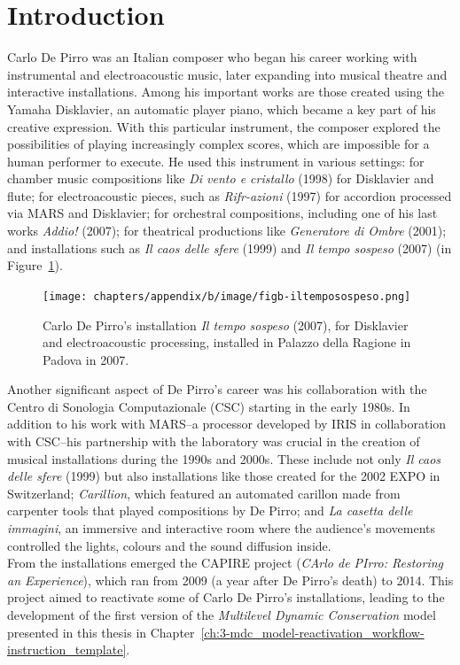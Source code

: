 \section{Introduction}
Carlo De Pirro was an Italian composer who began his career working with instrumental and electroacoustic music, later expanding into musical theatre and interactive installations. Among his important works are those created using the Yamaha Disklavier, an automatic player piano, which became a key part of his creative expression. With this particular instrument, the composer explored the possibilities of playing increasingly complex scores, which are impossible for a human performer to execute. He used this instrument in various settings: for chamber music compositions like \textit{Di vento e cristallo} (1998) for Disklavier and flute; for electroacoustic pieces, such as \textit{Rifr-azioni} (1997) for accordion processed via MARS and Disklavier; for orchestral compositions, including one of his last works \textit{Addio!} (2007); for theatrical productions like\textit{ Generatore di Ombre} (2001); and installations such as \textit{Il caos delle sfere} (1999) and \textit{Il tempo sospeso} (2007) (in Figure~\ref{fig:ab-iltemposospeso}).

\begin{figure}[!h]
    \centering
    \texttt{[image: chapters/appendix/b/image/figb-iltemposospeso.png]}
    \caption{Carlo De Pirro’s installation \textit{Il tempo sospeso} (2007), for Disklavier and electroacoustic processing, installed in Palazzo della Ragione in Padova in 2007.}
    \label{fig:ab-iltemposospeso}
\end{figure}

Another significant aspect of De Pirro's career was his collaboration with the Centro di Sonologia Computazionale (CSC) starting in the early 1980s. In addition to his work with MARS–a processor developed by IRIS in collaboration with CSC–his partnership with the laboratory was crucial in the creation of musical installations during the 1990s and 2000s. These include not only \textit{Il caos delle sfere} (1999) but also installations like those created for the 2002 EXPO in Switzerland; \textit{Carillion}, which featured an automated carillon made from carpenter tools that played compositions by De Pirro; and \textit{La casetta delle immagini}, an immersive and interactive room where the audience's movements controlled the lights, colours and the sound diffusion inside.\\
From the installations emerged the CAPIRE project (\textit{CArlo de PIrro: Restoring an Experience}), which ran from 2009 (a year after De Pirro's death) to 2014. This project aimed to reactivate some of Carlo De Pirro's installations, leading to the development of the first version of the \textit{Multilevel Dynamic Conservation} model \cite{bressan2009preserving, bressan2014challenge} presented in this thesis in Chapter~\ref{ch:3-mdc_model-reactivation_workflow-instruction_template}.

